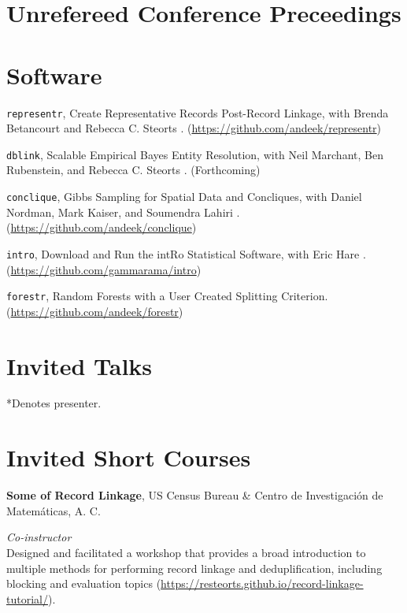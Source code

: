 \documentclass[margin,line]{res}
\begin{document}
\begin{resume}
\section{\sc Unrefereed Conference Preceedings}
\printbibliography[keyword=conf-unref, heading=none, resetnumbers=false]

\section{\sc Software}

\begin{enumerate}[label={[\arabic*]}, labelsep=.35cm]
\item \texttt{representr}, Create Representative Records Post-Record Linkage, with Brenda Betancourt and Rebecca C. Steorts \cite{kaplan2018posterior}. (\url{https://github.com/andeek/representr})
\item \texttt{dblink}, Scalable Empirical Bayes Entity Resolution, with Neil Marchant, Ben Rubenstein, and Rebecca C. Steorts \cite{marchant2018dblink}. (Forthcoming)
\item \texttt{conclique}, Gibbs Sampling for Spatial Data and Concliques, with Daniel Nordman, Mark Kaiser, and Soumendra Lahiri \cite{kaplan2016geometrically}. (\url{https://github.com/andeek/conclique})
\item \texttt{intro}, Download and Run the intRo Statistical Software, with Eric Hare \cite{hare2017introductory}. (\url{https://github.com/gammarama/intro})
\item \texttt{forestr}, Random Forests with a User Created Splitting Criterion. (\url{https://github.com/andeek/forestr})
\end{enumerate}

\section{\sc Invited Talks}
*Denotes presenter.\\
\printbibliography[keyword=talk-invited, heading=none, resetnumbers=true]

\section{\sc Invited Short Courses}

{\bf Some of Record Linkage}, US Census Bureau \& Centro de Investigaci\'{o}n de Matem\'{a}ticas, A. C.

\vspace{-.3cm}
{\em Co-instructor} \hfill \\
Designed and facilitated a workshop that provides a broad introduction to multiple methods for performing record linkage and deduplification, including blocking and evaluation topics (\url{https://resteorts.github.io/record-linkage-tutorial/}).



\end{resume}
\end{document}
